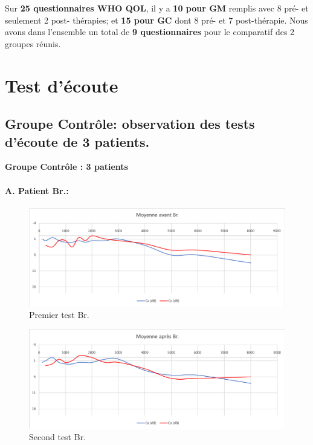 

Sur \textbf{25 questionnaires WHO QOL}, il y a \textbf{10 pour GM} remplis
avec 8 pré- et seulement 2
     post- thérapies; et \textbf{15 pour GC} dont 8 pré-
     et 7 post-thérapie.
      Nous avons dans l'ensemble un total de \textbf{9 questionnaires} pour le
     comparatif des 2 groupes réunis.
     
     
 


 \section{Test d'écoute}

  \subsection{Groupe Contrôle: observation des tests d'écoute de 3 patients.}


      \textbf{Groupe Contrôle : 3 patients}
  \paragraph{ A. Patient Br.:}
  \begin{figure}[ht]
\centering
\includegraphics[width=1\linewidth]{images/graphiques/bru_pre.png}
\caption[  \textbf{Groupe Contrôle}: Patient A. 1° test]{Premier test Br.}
\end{figure}



 \begin{figure}[th]
\centering
\includegraphics[width=1\linewidth]{images/graphiques/bru_post.png}
\caption[Patient A. :  2° test]{Second test Br.}

\end{figure}

